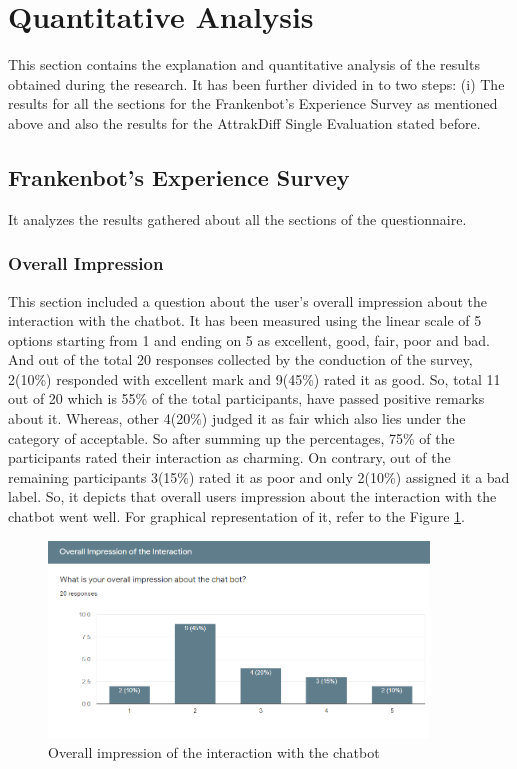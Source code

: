 \section{Quantitative Analysis}
This section contains the explanation and quantitative analysis of the results obtained during the research. It has been further divided in to two steps: (i) The results for all the sections for the Frankenbot's Experience Survey as mentioned above and also the results for the AttrakDiff Single Evaluation stated before. 

\subsection{Frankenbot's Experience Survey}
It analyzes the results gathered about all the sections of the questionnaire.

\subsubsection*{Overall Impression}
This section included a question about the user's overall impression about the interaction with the chatbot. It has been measured using the linear scale of 5 options starting from 1 and ending on 5 as excellent, good, fair, poor and bad. And out of the total 20 responses collected by the conduction of the survey, 2(10\%) responded with excellent mark and 9(45\%) rated it as good. So, total 11 out of 20 which is 55\% of the total participants, have passed positive remarks about it. Whereas, other 4(20\%) judged it as fair which also lies under the category of acceptable. So after summing up the percentages, 75\% of the participants rated their interaction as charming. On contrary, out of the remaining participants 3(15\%) rated it as poor and only 2(10\%) assigned it a bad label. So, it depicts that overall users impression about the interaction with the chatbot went well. For graphical representation of it, refer to the Figure \ref{fig:overallImpre}.

\begin{figure}[!h]
    \centering
    \includegraphics[width=0.9\textwidth]{img/Overall_Impression.PNG}
    \caption{Overall impression of the interaction with the chatbot}
    \label{fig:overallImpre}
\end{figure}


